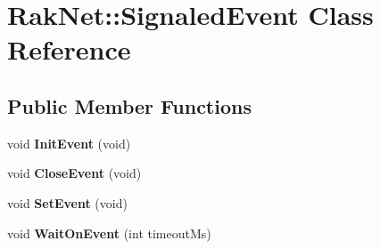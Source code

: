 \hypertarget{class_rak_net_1_1_signaled_event}{\section{Rak\-Net\-:\-:Signaled\-Event Class Reference}
\label{class_rak_net_1_1_signaled_event}
}
\subsection*{Public Member Functions}
\begin{DoxyCompactItemize}
\item 
\hypertarget{class_rak_net_1_1_signaled_event_a92d91bb25203b1f7f7001a64809a9697}{void {\bfseries Init\-Event} (void)}\label{class_rak_net_1_1_signaled_event_a92d91bb25203b1f7f7001a64809a9697}

\item 
\hypertarget{class_rak_net_1_1_signaled_event_a83bcdce88e8f63a98ac67fa6acb3294d}{void {\bfseries Close\-Event} (void)}\label{class_rak_net_1_1_signaled_event_a83bcdce88e8f63a98ac67fa6acb3294d}

\item 
\hypertarget{class_rak_net_1_1_signaled_event_ae771cd7cc568a770bab721f2bdfe3077}{void {\bfseries Set\-Event} (void)}\label{class_rak_net_1_1_signaled_event_ae771cd7cc568a770bab721f2bdfe3077}

\item 
\hypertarget{class_rak_net_1_1_signaled_event_a9594b0e98acacf792fad654cd1be6f4c}{void {\bfseries Wait\-On\-Event} (int timeout\-Ms)}\label{class_rak_net_1_1_signaled_event_a9594b0e98acacf792fad654cd1be6f4c}

\end{DoxyCompactItemize}
